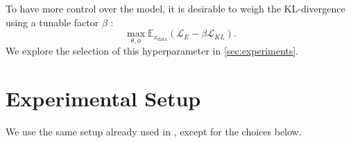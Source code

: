\documentclass[twoside,11pt]{article}
\begin{document}
To have more control over the model, it is desirable to weigh the KL-divergence using a tunable factor \(\beta\) \citep{higgins2016beta, li2020scalable}: \[ \max_{\theta, \phi} \mathbb{E}_{x_{\text{data}}} (\mathcal{L}_E - \beta \mathcal{L}_{KL}). \] We explore the selection of this hyperparameter in \cref{sec:experiments}.






\section{Experimental Setup}

We use the same setup already used in \cite{li2020scalable}, except for the choices below.
\end{document}
